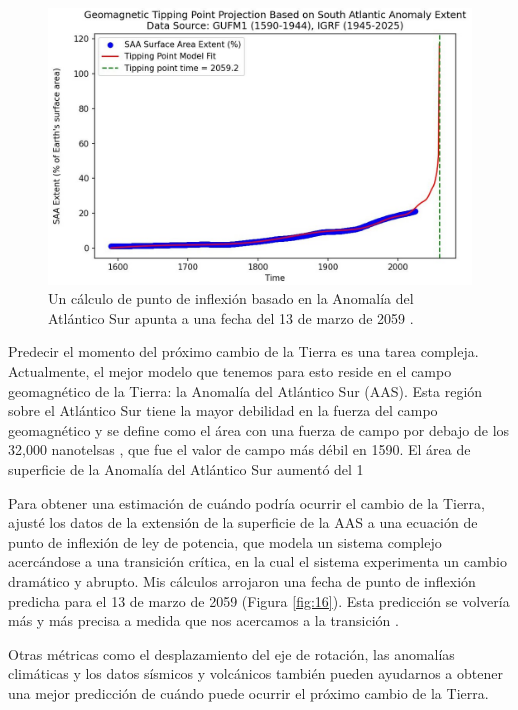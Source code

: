 \documentclass[10pt,twocolumn,letterpaper]{article}
\begin{document}
\begin{figure}[t]
\begin{center}
   \includegraphics[width=1\linewidth]{saa-crop.jpeg}
\end{center}
   \caption{Un cálculo de punto de inflexión basado en la Anomalía del Atlántico Sur apunta a una fecha del 13 de marzo de 2059 \cite{125,126}.}
\label{fig:16}
\label{fig:onecol}
\end{figure}

Predecir el momento del próximo cambio de la Tierra es una tarea compleja. Actualmente, el mejor modelo que tenemos para esto reside en el campo geomagnético de la Tierra: la Anomalía del Atlántico Sur (AAS). Esta región sobre el Atlántico Sur tiene la mayor debilidad en la fuerza del campo geomagnético y se define como el área con una fuerza de campo por debajo de los 32,000 nanotelsas \cite{135}, que fue el valor de campo más débil en 1590. El área de superficie de la Anomalía del Atlántico Sur aumentó del 1%

Para obtener una estimación de cuándo podría ocurrir el cambio de la Tierra, ajusté los datos de la extensión de la superficie de la AAS a una ecuación de punto de inflexión de ley de potencia, que modela un sistema complejo acercándose a una transición crítica, en la cual el sistema experimenta un cambio dramático y abrupto. Mis cálculos arrojaron una fecha de punto de inflexión predicha para el 13 de marzo de 2059 (Figura \ref{fig:16}). Esta predicción se volvería más y más precisa a medida que nos acercamos a la transición \cite{136}.

Otras métricas como el desplazamiento del eje de rotación, las anomalías climáticas y los datos sísmicos y volcánicos también pueden ayudarnos a obtener una mejor predicción de cuándo puede ocurrir el próximo cambio de la Tierra.
\end{document}
